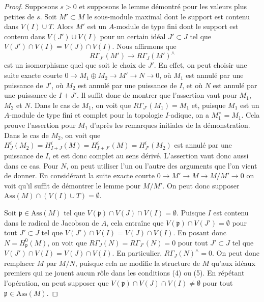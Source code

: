 \begin{proof}
\medskip\noindent
Supposons $s > 0$ et supposons le lemme démontré pour les valeurs plus petites de $s$.
Soit $M' \subset M$ le sous-module maximal dont le support est contenu
dans $V(I) \cup T$. Alors $M'$ est un $A$-module de type fini dont le support
est contenu dans $V(J') \cup V(I)$ pour un certain idéal $J' \subset J$
tel que $V(J') \cap V(I) = V(J) \cap V(I)$.
Nous affirmons que
$$
R\Gamma_{J'}(M') \to R\Gamma_J(M')^\wedge
$$
est un isomorphisme quel que soit le choix de $J'$.
En effet, on peut choisir une suite exacte courte
$0 \to M_1 \oplus M_2 \to M' \to N \to 0$, où
$M_1$ est annulé par une puissance de $J'$, où $M_2$ est annulé
par une puissance de $I$, et où $N$ est annulé par une puissance de $I + J'$.
Il suffit donc de montrer que l'assertion vaut pour $M_1$, $M_2$ et $N$.
Dans le cas de $M_1$, on voit que $R\Gamma_{J'}(M_1) = M_1$ et,
puisque $M_1$ est un $A$-module de type fini et complet pour la topologie $I$-adique,
on a $M_1^\wedge = M_1$. Cela prouve l'assertion pour $M_1$
d'après les remarques initiales de la démonstration. Dans le cas de $M_2$, on voit que
$H^i_J(M_2) = H^i_{I + J}(M) = H^i_{I + J'}(M) = H^i_{J'}(M_2)$
est annulé par une puissance de $I$, et est donc complet au sens dérivé.
L'assertion vaut donc aussi dans ce cas. Pour $N$, on peut utiliser l'un ou l'autre
des arguments que l'on vient de donner. En considérant la suite exacte courte
$0 \to M' \to M \to M/M' \to 0$
on voit qu'il suffit de démontrer le lemme pour $M/M'$.
On peut donc supposer $\text{Ass}(M) \cap (V(I) \cup T) = \emptyset$.

\medskip\noindent
Soit $\mathfrak p \in \text{Ass}(M)$ tel que
$V(\mathfrak p) \cap V(J) \cap V(I) = \emptyset$.
Puisque $I$ est contenu dans le radical de Jacobson de $A$, cela entraîne
que $V(\mathfrak p) \cap V(J') = \emptyset$ pour tout
$J' \subset J$ tel que $V(J') \cap V(I) = V(J) \cap V(I)$.
En posant donc $N = H^0_\mathfrak p(M)$, on voit que
$R\Gamma_J(N) = R\Gamma_{J'}(N) = 0$ pour tout
$J' \subset J$ tel que $V(J') \cap V(I) = V(J) \cap V(I)$.
En particulier, $R\Gamma_J(N)^\wedge = 0$.
On peut donc remplacer $M$ par $M/N$, puisque cela ne modifie la
structure de $M$ qu'aux idéaux premiers qui ne jouent aucun
rôle dans les conditions (4) ou (5). En répétant l'opération, on peut supposer que
$V(\mathfrak p) \cap V(J) \cap V(I) \not = \emptyset$
pour tout $\mathfrak p \in \text{Ass}(M)$.


\end{proof}
